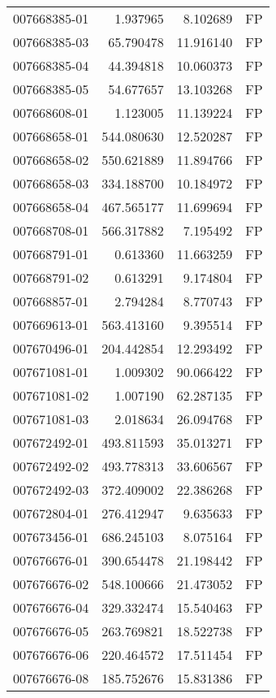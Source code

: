 \begin{tabular}{lrrl}
007668385-01 &    1.937965 &     8.102689 &   FP \\
007668385-03 &   65.790478 &    11.916140 &   FP \\
007668385-04 &   44.394818 &    10.060373 &   FP \\
007668385-05 &   54.677657 &    13.103268 &   FP \\
007668608-01 &    1.123005 &    11.139224 &   FP \\
007668658-01 &  544.080630 &    12.520287 &   FP \\
007668658-02 &  550.621889 &    11.894766 &   FP \\
007668658-03 &  334.188700 &    10.184972 &   FP \\
007668658-04 &  467.565177 &    11.699694 &   FP \\
007668708-01 &  566.317882 &     7.195492 &   FP \\
007668791-01 &    0.613360 &    11.663259 &   FP \\
007668791-02 &    0.613291 &     9.174804 &   FP \\
007668857-01 &    2.794284 &     8.770743 &   FP \\
007669613-01 &  563.413160 &     9.395514 &   FP \\
007670496-01 &  204.442854 &    12.293492 &   FP \\
007671081-01 &    1.009302 &    90.066422 &   FP \\
007671081-02 &    1.007190 &    62.287135 &   FP \\
007671081-03 &    2.018634 &    26.094768 &   FP \\
007672492-01 &  493.811593 &    35.013271 &   FP \\
007672492-02 &  493.778313 &    33.606567 &   FP \\
007672492-03 &  372.409002 &    22.386268 &   FP \\
007672804-01 &  276.412947 &     9.635633 &   FP \\
007673456-01 &  686.245103 &     8.075164 &   FP \\
007676676-01 &  390.654478 &    21.198442 &   FP \\
007676676-02 &  548.100666 &    21.473052 &   FP \\
007676676-04 &  329.332474 &    15.540463 &   FP \\
007676676-05 &  263.769821 &    18.522738 &   FP \\
007676676-06 &  220.464572 &    17.511454 &   FP \\
007676676-08 &  185.752676 &    15.831386 &   FP \\

\end{tabular}
